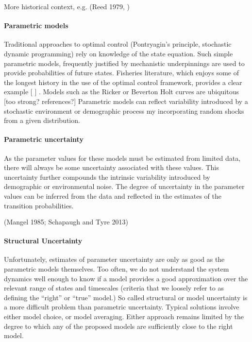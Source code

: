 \documentclass[author-year, review]{elsarticle} %
\begin{document}
More historical context, e.g. (Reed 1979, )

\paragraph{Parametric models}

Traditional approaches to optimal control (Pontryagin's principle,
stochastic dynamic programming) rely on knowledge of the state equation.
Such simple parametric models, frequently justified by mechanistic
underpinnings are used to provide probabilities of future states.
Fisheries literature, which enjoys some of the longest history in the
use of the optimal control framework, provides a clear example {[} {]} .
Models such as the Ricker or Beverton Holt curves are ubiquitous {[}too
strong? references?{]} Parametric models can reflect variability
introduced by a stochastic environment or demographic process my
incorporating random shocks from a given distribution.

\paragraph{Parametric uncertainty}

As the parameter values for these models must be estimated from limited
data,\\there will always be some uncertainty associated with these
values. This uncertainty further compounds the intrinsic variability
introduced by demographic or environmental noise. The degree of
uncertainty in the parameter values can be inferred from the data and
reflected in the estimates of the transition probabilities.

(Mangel 1985; Schapaugh and Tyre 2013)

\paragraph{Structural Uncertainty}

Unfortunately, estimates of parameter uncertainty are only as good as
the parametric models themselves. Too often, we do not understand the
system dynamics well enough to know if a model provides a good
approximation over the relevant range of states and timescales (criteria
that we loosely refer to as defining the ``right'' or ``true'' model.)
So called structural or model uncertainty is a more difficult problem
than parametric uncertainty. Typical solutions involve either model
choice, or model averaging. Either approach remains limited by the
degree to which any of the proposed models are sufficiently close to the
right model.
\end{document}

